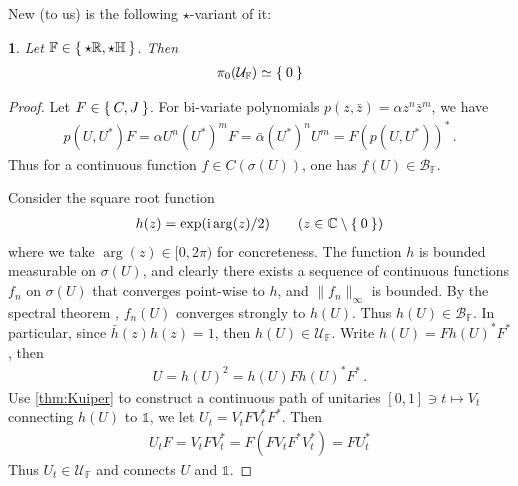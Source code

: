 \documentclass[a4paper,10pt]{article}
\numberwithin{equation}{section}
\theoremstyle{plain}
\newtheorem{thm}{\protect\theoremname}[section]
\theoremstyle{plain}
\theoremstyle{plain}
\theoremstyle{plain}
\theoremstyle{plain}
\theoremstyle{remark}
\theoremstyle{definition}
\theoremstyle{plain}
\providecommand{\theoremname}{Theorem}
\newcommand{\ii}{\operatorname{i}}
\newcommand{\RR}{\mathbb{R}}
\newcommand{\CC}{\mathbb{C}}
\newcommand{\FF}{\mathbb{F}}
\newcommand{\calB}{\mathcal{B}}
\newcommand{\calU}{\mathcal{U}}
\newcommand{\Id}{\mathds{1}}
\newcommand{\HH}{\mathbb{H}}
\newcommand{\eq}[1]{\begin{align*}#1\end{align*}}
\begin{document}
	New (to us) is the following $\star$-variant of it:
	\begin{thm}\label{star-RH Kuiper}
		Let $\FF\in\Set{\star\RR,\star\HH}$. Then \eq{\pi_0(\calU_\FF)\simeq \Set{0}}
	\end{thm}
	\begin{proof}
		Let $F\in \Set{C,J}$. For bi-variate polynomials $p(z,\bar{z})=\alpha z^n \bar{z}^m$, we have \eq{p(U,U^\ast)F=\alpha U^n (U^\ast)^m F=\bar{\alpha} (U^\ast)^n U^m = F(p(U,U^\ast))^\ast\,.} Thus for a continuous function $f\in C(\sigma(U))$, one has $f(U)\in \calB_\FF$. 
		
		Consider the square root function \eq{h(z)=\exp(\ii\arg(z)/2)\qquad(z\in\CC\setminus\Set{0})} where we take $\arg(z)\in[0,2\pi)$ for concreteness. The function $h$ is bounded measurable on $\sigma(U)$, and clearly there exists a sequence of continuous functions $f_n$ on $\sigma(U)$ that converges point-wise to $h$, and $\|f_n\|_\infty$ is bounded. By the spectral theorem \cite[Theorem VII.2(d)]{Reed_Simon_FA_0125850506}, $f_n(U)$ converges strongly to $h(U)$. Thus $h(U)\in \calB_\FF$. In particular, since $\bar{h}(z)h(z)=1$, then $h(U)\in \calU_\FF$. Write $h(U)=Fh(U)^* F^*$, then \eq{U=h(U)^2=h(U)Fh(U)^* F^*\,.} Use \cref{thm:Kuiper} to construct a continuous path of unitaries $[0,1]\ni t\mapsto V_t$ connecting $h(U)$ to $\Id$, we let $U_t=V_tFV_t^*F^*$. Then \eq{U_t F=V_tFV_t^*=F(FV_t F^* V_t^*)=FU_t^*} Thus $U_t\in\calU_\FF$ and connects $U$ and $\Id$.
	\end{proof}
	
\end{document}
